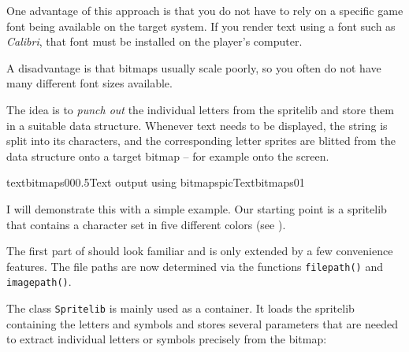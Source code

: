\begin{hintbox}
	One advantage of this approach is that you do not have to rely on a specific game font being available on the target system. If you render text using a font such as \emph{Calibri}, that font must be installed on the player’s computer. 
\end{hintbox}
\begin{warningbox}
	A disadvantage is that bitmaps usually scale poorly, so you often do not have many different font sizes available.
\end{warningbox}

The idea is to \emph{punch out} the individual letters from the spritelib and store them in a suitable data structure. Whenever text needs to be displayed, the string is split into its characters, and the corresponding letter sprites are blitted from the data structure onto a target bitmap -- for example onto the screen. 

\clearpage
{}%
{textbitmaps00}{0.5}{Text output using bitmaps}{picTextbitmaps01}
\clearpage

I will demonstrate this with a simple example. Our starting point is a spritelib that contains a character set in five different colors (see ).

The first part of  should look familiar and is only extended by a few convenience features. The file paths are now determined via the functions \texttt{filepath()} and \texttt{imagepath()}.



The class \texttt{Spritelib} is mainly used as a container. It loads the spritelib containing the letters and symbols and stores several parameters that are needed to extract individual letters or symbols precisely from the bitmap:

